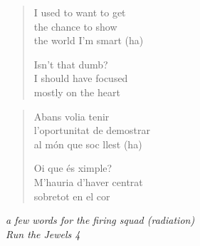 \clearpage\thispagestyle{empty}\vspace*{\fill}

\begin{verse}
I used to want to get \\
the chance to show \\
the world I'm smart (ha)

Isn't that dumb? \\
I should have focused \\
mostly on the heart
\end{verse}
\begin{verse}\small
Abans volia tenir \\
l'oportunitat de demostrar \\
al món que soc llest (ha)

Oi que és ximple? \\
M'hauria d'haver centrat \\
sobretot en el cor
\end{verse}
\begin{flushright}\small\itshape
a few words for the firing squad (radiation) \\
Run the Jewels 4
\end{flushright}

\vspace*{\fill}\clearpage
